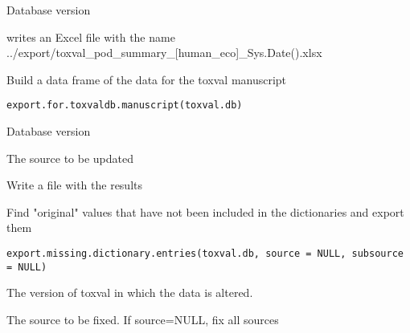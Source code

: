 \documentclass[letterpaper]{book}
\begin{document}
%
\begin{Arguments}
\begin{ldescription}
\item[\code{toxval.db}] Database version
\end{ldescription}
\end{Arguments}
%
\begin{Value}
writes an Excel file with the name
../export/toxval\_pod\_summary\_[human\_eco]\_Sys.Date().xlsx
\end{Value}
%
\begin{Description}\relax
Build a data frame of the data for the toxval manuscript
\end{Description}
%
\begin{Usage}
\begin{verbatim}
export.for.toxvaldb.manuscript(toxval.db)
\end{verbatim}
\end{Usage}
%
\begin{Arguments}
\begin{ldescription}
\item[\code{toxval.db}] Database version

\item[\code{source}] The source to be updated
\end{ldescription}
\end{Arguments}
%
\begin{Value}
Write a file with the results
\end{Value}
%
\begin{Description}\relax
Find "original" values that have not been included in the dictionaries
and export them
\end{Description}
%
\begin{Usage}
\begin{verbatim}
export.missing.dictionary.entries(toxval.db, source = NULL, subsource = NULL)
\end{verbatim}
\end{Usage}
%
\begin{Arguments}
\begin{ldescription}
\item[\code{toxval.db}] The version of toxval in which the data is altered.

\item[\code{source}] The source to be fixed. If source=NULL, fix all sources
\end{ldescription}
\end{Arguments}
\end{document}
